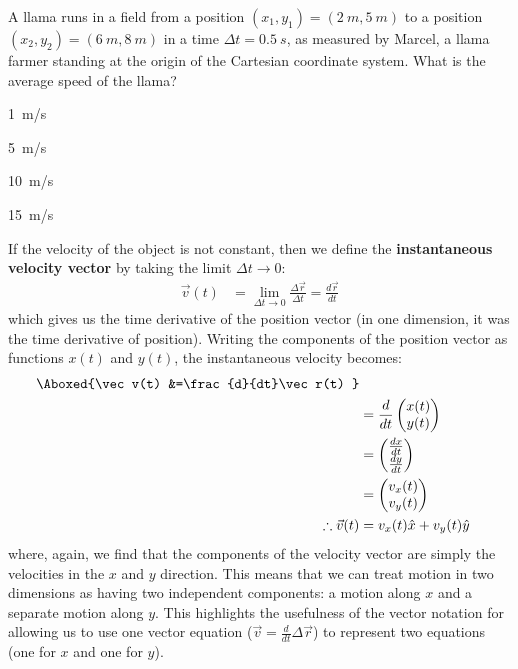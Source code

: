 \begin{checkpoint}\label{cp:describingmotioninnd:llama}
\begin{MCquestion}{A llama runs in a field from a position $(x_1,y_1)=(\SI{2}{m},\SI{5}{m})$ to a position $(x_2,y_2)=(\SI{6}{m},\SI{8}{m})$ in a time $\Delta t=\SI{0.5}{s}$, as measured by Marcel, a llama farmer standing at the origin of the Cartesian coordinate system. What is the average speed of the llama?}
\item \SI{1}{m/s}
\item \SI{5}{m/s}
\item \label{correct:describingmotioninnd:llama} \SI{10}{m/s}%
\item \SI{15}{m/s}
\end{MCquestion}
\end{checkpoint}

If the velocity of the object is not constant, then we define the \textbf{instantaneous velocity vector} by taking the limit $\Delta t\to 0$:
\begin{align}
\vec v(t) &= \lim_{\Delta t \to 0}\frac{\Delta \vec r}{\Delta t}=\frac{d\vec r}{dt}
\end{align}
which gives us the time derivative of the position vector (in one dimension, it was the time derivative of position). Writing the components of the position vector as functions $x(t)$ and $y(t)$, the instantaneous velocity becomes:
\begin{align}
\label{eqn:describingmotioninnd:vvecdef}
\Aboxed{\vec v(t) &=\frac{d}{dt}\vec r(t) }\\
&=\frac{d}{dt} \begin{pmatrix}
           x(t) \\
           y(t) \\
         \end{pmatrix}\nonumber\\ 
&=\begin{pmatrix}
           \frac{dx}{dt}  \\
          \frac{dy}{dt}  \\
         \end{pmatrix}\nonumber\\ 
 &=\begin{pmatrix}
           v_x(t) \\
           v_y(t) \\
         \end{pmatrix}\nonumber\\   
\therefore \vec v(t) &= v_x(t)\hat x+v_y(t)\hat y  \nonumber     
\end{align}
where, again, we find that the components of the velocity vector are simply the velocities in the $x$ and $y$ direction. This means that we can treat motion in two dimensions as having two independent components: a motion along $x$ and a separate motion along $y$. This highlights the usefulness of the vector notation for allowing us to use one vector equation ($\vec v=\frac{d}{dt}\Delta \vec r$) to represent two equations (one for $x$ and one for $y$). 


